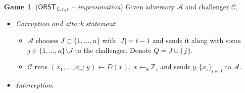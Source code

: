 \documentclass[psamsfonts, reqno]{amsart}
\theoremstyle{definition}
\newtheorem{attack_game}[thm]{Game}
\theoremstyle{remark}
\numberwithin{equation}{section}
\begin{document}
\begin{attack_game}\label{orst_attack_impersonation}
\vspace{6pt}
(\textit{\textup{$\mathsf{ORST}_{\hspace{1pt}\mathbb{G}, n, t}$} -- impersonation})
Given adversary $\mathcal{A}$ and challenger $\mathcal{C}$,
\begin{itemize}[label=$\bullet$,leftmargin=20pt,rightmargin=0pt]
	\vspace{3pt}
	\item
		\textit{Corruption and attack statement}:
			\begin{itemize}[
				label=$\circ$,leftmargin=17pt,rightmargin=21pt
			]
			\vspace{3pt}
			\item $\mathcal{A}$ chooses $J \subset \{1, \dots, n\}$
				with $|J\hspace{1pt}| = t - 1$
				and sends it along with some
				$j \in \{1, \dots, n\} \setminus J$
				to the challenger.
				Denote $Q = J \cup \{\hspace{1pt}j\hspace{1pt}\}$.
				\vspace{3pt}
			\item $\mathcal{C}$ runs
				$(\hspace{1pt}x_1, \dots, x_n;\hspace{1pt} y\hspace{1pt})
				\leftarrow D(x), \ x \leftarrow_\$ \mathbb{Z}_q$
				and sends $y, \{x_i\}_{i \in J}$
				to $\mathcal{A}$.
			\vspace{5pt}
			\end{itemize}
	\item
		\textit{Interception}:

\end{itemize}
\end{attack_game}
\end{document}
